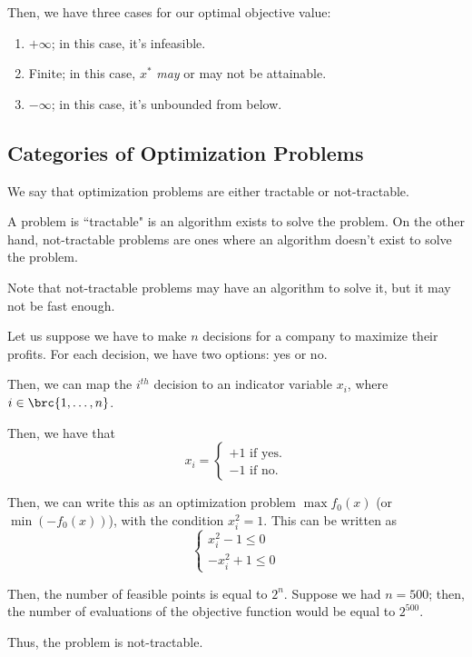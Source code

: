 \documentclass[openany]{book}
\begin{document}
Then, we have three cases for our optimal objective value:
\begin{enumerate}
	\item $+\infty$; in this case, it's infeasible.
	\item Finite; in this case, $x^{*}$ \textit{may} or may not be attainable.
	\item $-\infty$; in this case, it's unbounded from below.
\end{enumerate}

\subsection{Categories of Optimization Problems}
We say that optimization problems are either tractable or not-tractable.

\begin{defn}
	A problem is ``tractable" is an algorithm exists to solve the problem. On the other hand, not-tractable problems are ones where an algorithm doesn't exist to solve the problem.
\end{defn}
\begin{warn}
	Note that not-tractable problems may have an algorithm to solve it, but it may not be fast enough.
\end{warn}

\begin{example}
	Let us suppose we have to make $n$ decisions for a company to maximize their profits. For each decision, we have two options: yes or no.
	
	Then, we can map the $i^{th}$ decision to an indicator variable $x_i$, where $i \in \brc{1, \ldots, n}$.
	
	Then, we have that
	\begin{equation*}
		x_i = \begin{cases}
			+1 \text{ if yes.}\\ -1 \text{ if no.}
			\end{cases}
	\end{equation*}

	Then, we can write this as an optimization problem $\max f_0(x)$ (or $\min (-f_0(x))$), with the condition $x_i^{2} = 1$. This can be written as \begin{equation*}
		\begin{cases} x_i^{2}  - 1 \leq 0 \\ -x_i^{2} + 1 \leq 0 \end{cases}
	\end{equation*}
	
	Then, the number of feasible points is equal to $2^{n}$. Suppose we had $n = 500$; then, the number of evaluations of the objective function would be equal to $2^{500}$.
	
	Thus, the problem is not-tractable.
\end{example}
\end{document}

